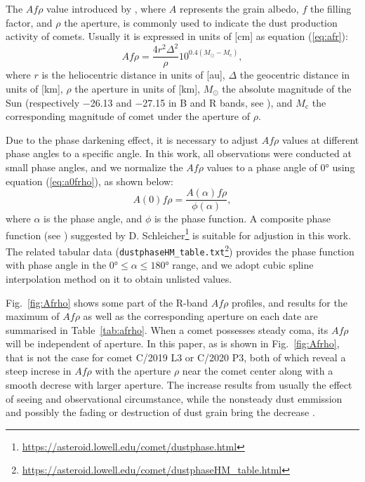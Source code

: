 The $Af\rho$ value introduced by \citet{ahearn_comet_1984}, where $A$ represents the grain albedo, $f$ the filling factor, and $\rho$ the aperture, is commonly used to indicate the dust production activity of comets. Usually it is expressed in units of [\unit{\cm}] as equation (\ref{eq:afr}): 
\begin{equation}
    Af\rho = \frac{4 r^2 \Delta^2}{\rho} 10^{0.4(M_\odot - M_\mathrm{c})}, 
    \label{eq:afr}
\end{equation}
where $r$ is the heliocentric distance in units of [\si{\astronomicalunit}], $\Delta$ the geocentric distance in units of [\si{\km}], $\rho$ the aperture in units of [\si{\km}], $M_\odot$ the absolute magnitude of the Sun (respectively \num{-26.13} and \num{-27.15} in B and R bands, see \citealt{willmer_absolute_2018}), and $M_\mathrm{c}$ the corresponding magnitude of comet under the aperture of $\rho$. 

Due to the phase darkening effect, it is necessary to adjust $Af\rho$ values at different phase angles to a specific angle. In this work, all observations were conducted at small phase angles, and we normalize the $Af\rho$ values to a phase angle of \ang{0} using equation (\ref{eq:a0frho}), as shown below:
\begin{equation}
    A(0)f\rho = \frac{A(\alpha)f\rho}{\phi(\alpha)}, \label{eq:a0frho}
\end{equation}
where $\alpha$ is the phase angle, and $\phi$ is the phase function. A composite phase function (see \citealt{schleicher_composition_2011, marcus_forward-scattering_2007}) suggested by D. Schleicher\footnote{\url{https://asteroid.lowell.edu/comet/dustphase.html}} is suitable for adjustion in this work. The related tabular data (\verb|dustphaseHM_table.txt|\footnote{\url{https://asteroid.lowell.edu/comet/dustphaseHM_table.html}}) provides the phase function with phase angle in the $\ang{0} \leqslant \alpha \leqslant \ang{180}$ range, and we adopt cubic spline interpolation method on it to obtain unlisted values. 

Fig.~\ref{fig:Afrho} shows some part of the R-band $Af\rho$ profiles, and results for the maximum of $Af\rho$ as well as the corresponding aperture on each date are summarised in Table~\ref{tab:afrho}. When a comet possesses steady coma, its $Af\rho$ will be independent of aperture. In this paper, as is shown in Fig.~\ref{fig:Afrho}, that is not the case for comet C/2019 L3 or C/2020 P3, both of which reveal a steep increse in $Af\rho$ with the aperture $\rho$ near the comet center along with a smooth decrese with larger aperture. The increase results from usually the effect of seeing and observational circumstance, while the nonsteady dust emmission and possibly the fading or destruction of dust grain bring the decrease \citep{lara_behaviour_2003,tozzi_imaging_2003}.  
             
